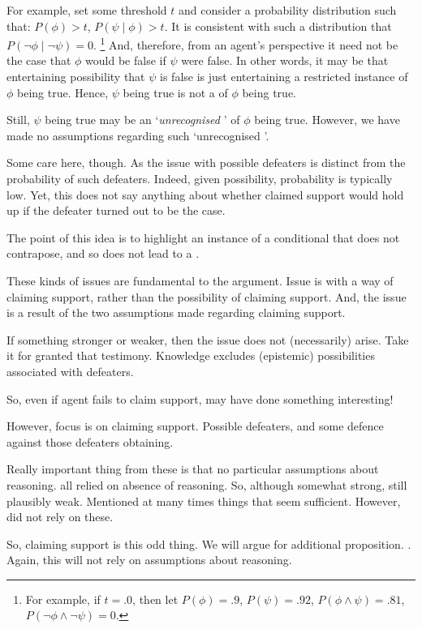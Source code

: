 \begin{note}
  For example, set some threshold \(t\) and consider a probability distribution such that:
  \(P(\phi) > t\), \(P(\psi \mid \phi) > t\).
  It is consistent with such a distribution that \(P(\lnot\phi \mid \lnot\psi) = 0\).\nolinebreak
  \footnote{
    For example, if \(t = .0\), then let \(P(\phi) = .9\), \(P(\psi) = .92\), \(P(\phi \land \psi) = .81\), \(P(\lnot\phi \land \lnot\psi) = 0\).
  }
  And, therefore, from an agent's perspective it need not be the case that \(\phi\) would be false if \(\psi\) were false.
  In other words, it may be that entertaining possibility that \(\psi\) is false is just entertaining a restricted instance of \(\phi\) being true.
  Hence, \(\psi\) being true is not a \requ{} of \(\phi\) being true.

  Still,  \(\psi\) being true may be an `\emph{unrecognised} \requ{}' of \(\phi\) being true.
  However, we have made no assumptions regarding such `unrecognised '.

  {
    \color{red}
    Some care here, though.
    As the issue with possible defeaters is distinct from the probability of such defeaters.
    Indeed, given possibility, probability is typically low.
    Yet, this does not say anything about whether claimed support would hold up if the defeater turned out to be the case.

    The point of this {\color{red} idea} is to highlight an instance of a conditional that does not contrapose, and so does not lead to a \requ{}.
  }
\end{note}

\begin{note}
  These kinds of issues are fundamental to the argument.
  Issue is with a way of claiming support, rather than the possibility of claiming support.
  And, the issue is a result of the two assumptions made regarding claiming support.

  If something stronger or weaker, then the issue does not (necessarily) arise.
  Take it for granted that testimony.
  Knowledge excludes (epistemic) possibilities associated with defeaters.

  So, even if agent fails to claim support, may have done something interesting!

  However, focus is on claiming support.
  Possible defeaters, and some defence against those defeaters obtaining.

  Really important thing from these  is that no particular assumptions about reasoning.
   all relied on absence of reasoning.
  So, although somewhat strong, still plausibly weak.
  Mentioned at many times things that seem sufficient.
  However, did not rely on these.

  So, claiming support is this odd thing.
  We will argue for additional proposition.
  \nI{}.
  Again, this will not rely on assumptions about reasoning.
\end{note}

